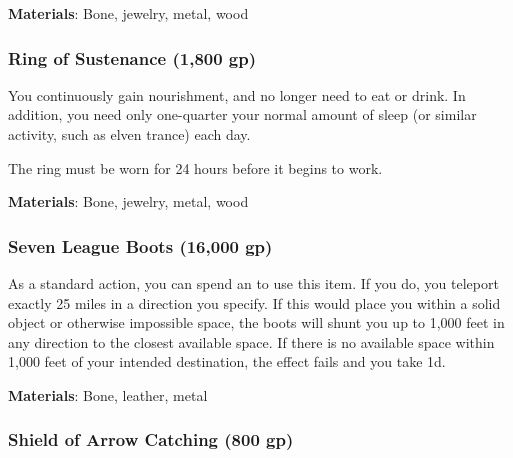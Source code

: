 \vspace{0.25em}
\textbf{Materials}: Bone, jewelry, metal, wood


\lowercase{\hypertarget{item:Ring of Sustenance}{}}\label{item:Ring of Sustenance}
\hypertarget{item:Ring of Sustenance}{\subsubsection{Ring of Sustenance\hfill{} (1,800 gp)}}

You continuously gain nourishment, and no longer need to eat or drink.
In addition, you need only one-quarter your normal amount of sleep (or similar activity, such as elven trance) each day.

The ring must be worn for 24 hours before it begins to work.



\vspace{0.25em}
\textbf{Materials}: Bone, jewelry, metal, wood


\lowercase{\hypertarget{item:Seven League Boots}{}}\label{item:Seven League Boots}
\hypertarget{item:Seven League Boots}{\subsubsection{Seven League Boots\hfill{} (16,000 gp)}}

As a standard action, you can spend an  to use this item.
If you do, you teleport exactly 25 miles in a direction you specify.
If this would place you within a solid object or otherwise impossible space, the boots will shunt you up to 1,000 feet in any direction to the closest available space.
If there is no available space within 1,000 feet of your intended destination, the effect fails and you take  \minus1d.



\vspace{0.25em}
\textbf{Materials}: Bone, leather, metal


\lowercase{\hypertarget{item:Shield of Arrow Catching}{}}\label{item:Shield of Arrow Catching}
\hypertarget{item:Shield of Arrow Catching}{\subsubsection{Shield of Arrow Catching\hfill{} (800 gp)}}

